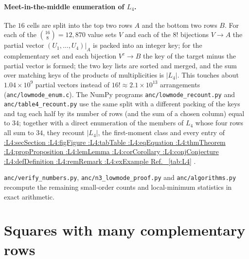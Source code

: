 \documentclass[11pt,a4paper]{article}
\makeatletter
\def\Cref@getprefix#1:#2\relax{#1}
\def\Cref@prefix@sec{sec}
\def\Cref@prefix@fig{fig}
\def\Cref@prefix@tab{tab}
\def\Cref@prefix@eq{eq}
\def\Cref@prefix@thm{thm}
\def\Cref@prefix@prop{prop}
\def\Cref@prefix@lem{lem}
\def\Cref@prefix@cor{cor}
\def\Cref@prefix@conj{conj}
\def\Cref@prefix@def{def}
\def\Cref@prefix@rem{rem}
\def\Cref@prefix@ex{ex}
\def\Cref@type@cap#1{%
  \edef\Cref@tmp{#1}%
  \ifx\Cref@tmp\Cref@prefix@sec Section%
  \else\ifx\Cref@tmp\Cref@prefix@fig Figure%
  \else\ifx\Cref@tmp\Cref@prefix@tab Table%
  \else\ifx\Cref@tmp\Cref@prefix@eq Equation%
  \else\ifx\Cref@tmp\Cref@prefix@thm Theorem%
  \else\ifx\Cref@tmp\Cref@prefix@prop Proposition%
  \else\ifx\Cref@tmp\Cref@prefix@lem Lemma%
  \else\ifx\Cref@tmp\Cref@prefix@cor Corollary%
  \else\ifx\Cref@tmp\Cref@prefix@conj Conjecture%
  \else\ifx\Cref@tmp\Cref@prefix@def Definition%
  \else\ifx\Cref@tmp\Cref@prefix@rem Remark%
  \else\ifx\Cref@tmp\Cref@prefix@ex Example%
  \else Ref.%
  \fi\fi\fi\fi\fi\fi\fi\fi\fi\fi\fi\fi
}
\DeclareRobustCommand{\Cref}[1]{%
  \begingroup
  \edef\Cref@label{#1}%
  \edef\Cref@prefix{\expandafter\Cref@getprefix\Cref@label:\relax}%
  \hyperref[#1]{\Cref@type@cap{\Cref@prefix}~\ref*{#1}}%
  \endgroup
}
\theoremstyle{plain}
\theoremstyle{definition}
\theoremstyle{remark}
\makeatother
\begin{document}
\paragraph{Meet-in-the-middle enumeration of $L_4$.}
The $16$ cells are split into the top two rows $A$ and the bottom two rows $B$.
For each of the $\binom{16}{8}=12{,}870$ value sets $V$ and each of the $8!$ bijections $V\to A$ the partial vector $(U_1,\dots,U_4)|_A$ is packed into an integer key; for the complementary set and each bijection $V^c\to B$ the key of the target minus the partial vector is formed; the two key lists are sorted and merged, and the sum over matching keys of the products of multiplicities is $|L_4|$.
This touches about $1.04\times10^9$ partial vectors instead of $16!\approx2.1\times10^{13}$ arrangements (\texttt{anc/lowmode\_enum.c}).
The NumPy programs \texttt{anc/lowmode\_recount.py} and \texttt{anc/table4\_recount.py} use the same split with a different packing of the keys and tag each half by its number of rows (and the sum of a chosen column) equal to $34$; together with a direct enumeration of the members of $L_4$ whose four rows all sum to $34$, they recount $|L_4|$, the first-moment class and every entry of \Cref{tab:L4}.

\texttt{anc/verify\_numbers.py}, \texttt{anc/n3\_lowmode\_proof.py} and \texttt{anc/algorithms.py} recompute the remaining small-order counts and local-minimum statistics in exact arithmetic.

\section{Squares with many complementary rows}
\label{sec:app_twin}
\end{document}
